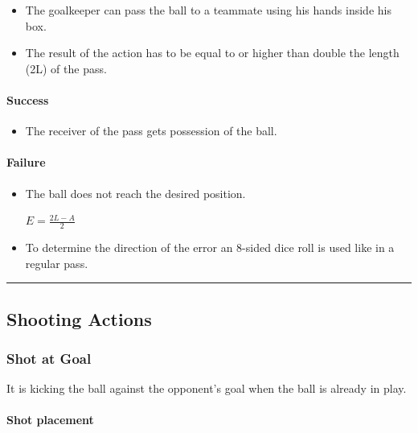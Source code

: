 \documentclass[12pt]{article}
\begin{document}
\begin{rulebox}
\begin{itemize}
\item The goalkeeper can pass the ball to a teammate using his hands inside his box.
\item The result of the action has to be equal to or higher than double the length (2L) of the pass.
\end{itemize}
\end{rulebox}

\paragraph{Success}

\begin{rulebox}
\begin{itemize}
\item The receiver of the pass gets possession of the ball.
\end{itemize}
\end{rulebox}

\paragraph{Failure}

\begin{rulebox}
\begin{itemize}
\item The ball does not reach the desired position.
\begin{formulabox}
$E = \frac{2L - A}{2}$
\end{formulabox}
\item To determine the direction of the error an 8-sided dice roll is used like in a regular pass.
\end{itemize}
\end{rulebox}

\bigskip\hrule\bigskip

\subsection{\textbf{Shooting Actions}}

\subsubsection{Shot at Goal}
It is kicking the ball against the opponent's goal when the ball is already in play.

\paragraph{Shot placement}
\end{document}
